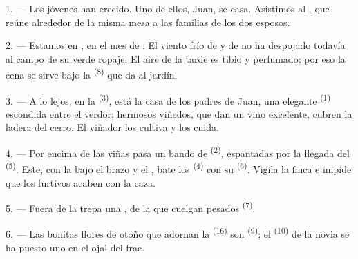 
\VUsaut{4.0mm}
\VUsaut{1.6mm}
\VUsaut{3.2mm}

\VUsaut{1.6mm}
\VUsaut{2.6mm}

\VUsaut{3.0mm}

1. --- Los jóvenes han crecido. Uno de ellos, Juan, se casa. Asistimos al
, que reúne alrededor de la misma mesa a las
familias de los dos esposos.

2. --- Estamos en , en el mes de . El viento
frío de  y de  no ha despojado todavía al
campo de su verde ropaje. El aire de la tarde es tibio y perfumado; por
eso la cena se sirve bajo la  \textsuperscript{(8)} que da al
jardín.

3. --- A lo lejos, en la  \textsuperscript{(3)}, está la casa de los
padres de Juan, una elegante  \textsuperscript{(1)} escondida
entre el verdor; hermosos viñedos, que dan un vino excelente, cubren la
ladera del cerro. El viñador los cultiva y los cuida.

4. --- Por encima de las viñas pasa un bando de 
\textsuperscript{(2)}, espantadas por la llegada del 
\textsuperscript{(5)}. Este, con la  bajo el brazo y el
, bate los  \textsuperscript{(4)} con
su  \textsuperscript{(6)}. Vigila la finca e impide que los furtivos
acaben con la caza.

5. --- Fuera de la  trepa una , de la que cuelgan
pesados  \textsuperscript{(7)}.

6. --- Las bonitas flores de otoño que adornan la 
\textsuperscript{(16)} son  \textsuperscript{(9)}; el 
\textsuperscript{(10)} de la novia se ha puesto uno en el ojal del frac.

